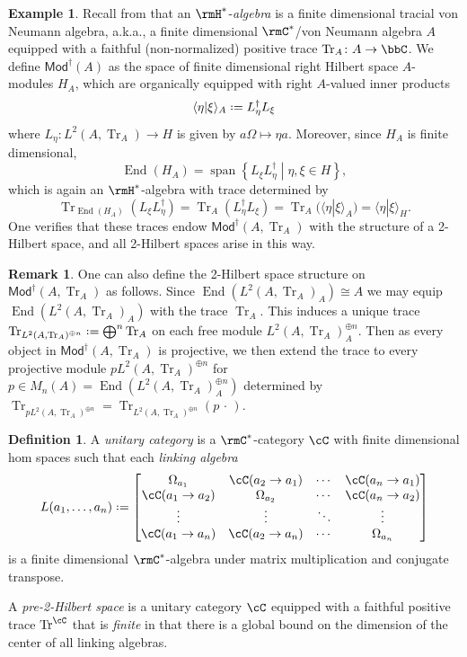 \documentclass[12pt, reqno]{amsart}
\DeclareMathOperator{\End}{End}
\DeclareMathOperator{\Tr}{Tr}
\newcommand{\set}[2]{\left\{#1 \middle| #2\right\}}
\newcommand{\Mod}{\mathsf{Mod}}
\theoremstyle{plain}
\theoremstyle{definition}
\newtheorem{defn}[thm]{Definition}
\newtheorem{ex}[thm]{Example}
\newtheorem{rem}[thm]{Remark}
\newcommand{\coloneq}{:=}
\def\coloneq{\mathrel{\vcenter{\baselineskip0.55ex\lineskiplimit0pt\hbox{\upshape.}\hbox{\upshape.}}}=}
\begin{document}
\begin{ex}
Recall from \cite{MR13235,MR3971584,MR5078555} that an $\rmH^*$-\emph{algebra} is a finite dimensional tracial von Neumann algebra, a.k.a., a finite dimensional $\rmC^*$/von Neumann algebra $A$ equipped with a faithful (non-normalized) positive trace $\Tr_A\colon  A\to \bbC$.
We define $\Mod^\dag(A)$ as the space of finite dimensional right Hilbert space $A$-modules $H_A$, which are organically equipped with right $A$-valued inner products
$$
\langle \eta|\xi\rangle_A \coloneq L_\eta^\dag L_\xi
$$
where $L_\eta\colon  L^2(A,\Tr_A)\to H$ is given by $a\Omega\mapsto \eta a$.
Moreover, since $H_A$ is finite dimensional,
$$
\End(H_A) = \operatorname{span}\set{L_\xi L_\eta^\dag}{\eta,\xi\in H},
$$ 
which is again an $\rmH^*$-algebra with trace determined by
$$
\Tr_{\End(H_A)}(L_\xi L_\eta^\dag)
=
\Tr_A(L_\eta^\dag L_\xi) 
= 
\Tr_A(\langle \eta|\xi\rangle_A)
=
\langle \eta|\xi\rangle_H.
$$
One verifies that these traces endow $\Mod^\dag(A,\Tr_A)$ with the structure of a 2-Hilbert space, and all 2-Hilbert spaces arise in this way.
\end{ex}

\begin{rem}
\label{rem:ExtendTraceToCompletion}
One can also define the 2-Hilbert space structure on $\Mod^\dag(A,\Tr_A)$ as follows.
Since $\End(L^2(A,\Tr_A)_A) \cong A$ we may equip $\End(L^2(A,\Tr_A)_A)$ with the trace $\Tr_A$.
This induces a unique trace $\Tr_{L^2(A,\Tr_A)^{\oplus n}} \coloneq \bigoplus^n \Tr_A$ on each free module $L^2(A,\Tr_A)^{\oplus n}_A$.
Then as every object in $\Mod^\dag(A,\Tr_A)$ is projective, we then extend the trace to every projective module $pL^2(A,\Tr_A)^{\oplus n}$ 
for $p\in M_n(A) = \End(L^2(A,\Tr_A)^{\oplus n}_A)$
determined by $\Tr_{pL^2(A,\Tr_A)^{\oplus n}} = \Tr_{L^2(A,\Tr_A)^{\oplus n}}(p \, \cdot\,).$ 
\end{rem}

\begin{defn}
A \emph{unitary category} is a $\rmC^*$-category $\cC$ with finite dimensional hom spaces such that each \emph{linking algebra}
$$
L(a_1,\dots, a_n)\coloneq
\begin{bmatrix}
\Omega_{a_1} & \cC(a_2\to a_1) & \cdots & \cC(a_n\to a_1) \\
\cC(a_1\to a_2) & \Omega_{a_2} & \cdots & \cC(a_n\to a_2) \\
\vdots & \vdots & \ddots & \vdots \\
\cC(a_1\to a_n) & \cC(a_2\to a_n) & \cdots & \Omega_{a_n}
\end{bmatrix}
$$
is a finite dimensional $\rmC^*$-algebra under matrix multiplication and conjugate transpose.

A \emph{pre-2-Hilbert space} is a unitary category $\cC$ equipped with a faithful positive trace $\Tr^\cC$ that is \emph{finite} in that there is a global bound on the dimension of the center of all linking algebras.
\end{defn}
\end{document}
